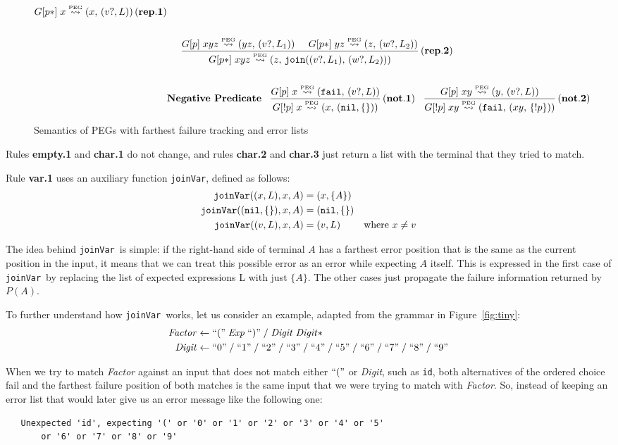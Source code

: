\documentclass[3p,12pt,singlecolumn]{elsarticle}
\newcommand{\fivespaces}{\;\;\;\;\;}
\newcommand{\mylabel}[1]{\, \mathbf{(#1)}}
\newcommand{\Lp}{\stackrel{\mbox{\tiny{PEG}}}{\leadsto}}
\newcommand{\Tup}[2]{(#1,\,#2)}
\newcommand{\Ex}{v?}
\newcommand{\Ey}{w?}
\newcommand{\Fail}{{\tt fail}}
\newcommand{\Nil}{{\tt nil}}
\newcommand{\Mon}[1]{\{#1\}}
\newcommand{\J}{{\tt join}}
\newcommand{\Jj}[2]{\J(#1,\,#2)}
\newcommand{\Jv}{{\tt joinVar}}
\begin{document}
\begin{figure}[p]
{\begin{align*}
{      {G[p*] \; x \Lp \Tup{x}{(\Ex,L)}}} \mylabel{rep.1}
\\ \\
& \fivespaces {\frac{G[p] \; xyz \Lp \Tup{yz}{(\Ex,L_1)} \fivespaces G[p*] \; yz \Lp \Tup{z}{(\Ey,L_2)}}
      {G[p*] \; xyz \Lp \Tup{z}{\Jj{(\Ex,L_1)}{(\Ey,L_2)}}}} \mylabel{rep.2}
\\ \\
& \textbf{Negative Predicate} \;\;\;
{\frac{G[p] \; x \Lp \Tup{\Fail}{(\Ex,L)}}
      {G[!p] \; x \Lp \Tup{x}{(\Nil,\{\})}}} \mylabel{not.1}
\;\;\;
{\frac{G[p] \; xy \Lp \Tup{y}{(\Ex,L)}}
      {G[!p] \; xy \Lp \Tup{\Fail}{\Tup{xy}{\Mon{!p}}}}} \mylabel{not.2}
\end{align*}
}
\caption{Semantics of PEGs with farthest failure tracking and error lists}
\label{fig:semfarthestjoin}
\end{figure}

Rules {\bf empty.1} and {\bf char.1} do not change,
and rules {\bf char.2} and {\bf char.3} just 
return a list with the terminal that
they tried to match.

Rule {\bf var.1} uses an auxiliary function \Jv, defined
as follows:
\begin{align*}
\Jv((x,L),x,A) & =  (x,\{A\}) \\
\Jv((\Nil,\{\}),x,A) & =  (\Nil,\{\}) \\
\Jv((v,L),x,A) & =  (v,L) & \mathrm{where}\ x \neq v
\end{align*}

The idea behind \Jv\ is simple: if the right-hand side
of terminal $A$ has a farthest error position that is the
same as the current position in the input, it means that
we can treat this possible error as an error while
expecting $A$ itself. This is expressed in the first
case of \Jv\ by replacing the list of expected expressions
L with just $\{A\}$. The other cases just propagate the
failure information returned by $P(A)$.

To further understand how \Jv\ works, let us consider an example,
adapted from the grammar in Figure~\ref{fig:tiny}:
\begin{align*}
\it{Factor} & \leftarrow ``(" \; \it{Exp} \; ``)"
  \; / \; \it{Digit} \; \it{Digit}* \\
\it{Digit} & \leftarrow ``0" \;/\; ``1" \;/\; ``2"
\;/\; ``3" \;/\; ``4" \;/\; ``5" \;/\; ``6" \;/\; ``7"
\;/\; ``8" \;/\; ``9"
\end{align*}

When we try to match {\it Factor} against
an input that does not match either $``("$
or {\it Digit}, such as \texttt{id}, both
alternatives of the ordered choice fail and the farthest
failure position of both matches is the same input that
we were trying to match with {\it Factor}.
So, instead of keeping
an error list that would later give us an error message like
the following one:
\begin{verbatim}
   Unexpected 'id', expecting '(' or '0' or '1' or '2' or '3' or '4' or '5'
       or '6' or '7' or '8' or '9'
\end{verbatim}
\end{document}
